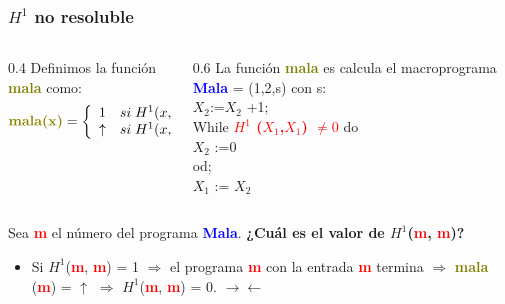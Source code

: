 \documentclass[xcolor=table]{beamer}
\begin{document}
\begin{frame}[fragile]\frametitle{$H^1$ no resoluble} \scriptsize


    \begin{columns}
        \begin{column}{0.4\textwidth}
            Definimos la función \textbf{\textcolor{olive}{mala}} como:
            \[ \textbf{\textcolor{olive}{mala(x)}}  = \left\{ \begin{array}{lr} 1 & si\; H^1(x,x)=0 \\ 
                                                     \uparrow &  si\;H^1(x,x)=1
                                \end{array} \right. \]
        \end{column}
        \begin{column}{0.6\textwidth}
        La función \textbf{\textcolor{olive}{mala}} es calcula el macroprograma \textbf{\textcolor{blue}{Mala}} = (1,2,s) con s:\\
        \vspace{0.2cm}
                \hspace{0.1cm}$X_2$:=$X_2$ +1;\\
                \hspace{0.1cm}While \textbf{\textcolor{red}{$H^1$ ($X_1$,$X_1$) $\neq 0$}}  do\\
                \hspace{0.3cm}$X_2$ :=0\\
                \hspace{0.1cm}od;\\
                \hspace{0.1cm}$X_1$ := $X_2$\\
        \end{column}
    \end{columns}
\vspace{0.3cm}

Sea \textbf{\textcolor{red}{m}} el número del programa \textbf{\textcolor{blue}{Mala}}. \textbf{¿Cuál es el valor de $H^1$(\textbf{\textcolor{red}{m}}, \textbf{\textcolor{red}{m}})?}\\

\begin{itemize}
    \item Si $H^1$(\textbf{\textcolor{red}{m}}, \textbf{\textcolor{red}{m}}) = 1 $\Rightarrow$ el programa \textbf{\textcolor{red}{m}} con la entrada \textbf{\textcolor{red}{m}} termina $\Rightarrow$  \textbf{\textcolor{olive}{mala}} (\textbf{\textcolor{red}{m}}) = $\uparrow$ $\Rightarrow$ $H^1$(\textbf{\textcolor{red}{m}}, \textbf{\textcolor{red}{m}}) = 0. $\rightarrow \leftarrow$


\end{itemize}
\end{frame}
\end{document}
